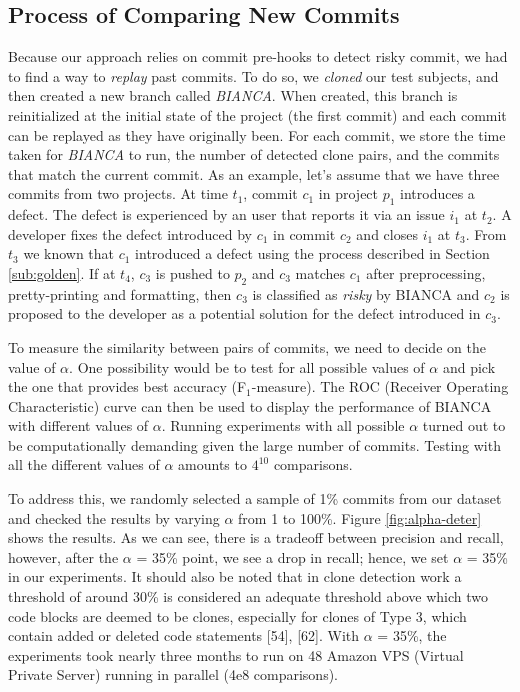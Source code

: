 \documentclass[conference]{IEEEtran}
\begin{document}
\subsection{Process of Comparing New Commits}\label{sec:newcommits}

Because our approach relies on commit pre-hooks to detect risky commit,
we had to find a way to \emph{replay} past commits. To do so, we
\emph{cloned} our test subjects, and then created a new branch called
\emph{BIANCA}. When created, this branch is reinitialized at the initial
state of the project (the first commit) and each commit can be replayed
as they have originally been. For each commit, we store the time taken
for \emph{BIANCA} to run, the number of detected clone pairs, and the
commits that match the current commit. As an example, let's assume that
we have three commits from two projects. At time $t_1$, commit $c_1$ in
project $p_1$ introduces a defect. The defect is experienced by an user
that reports it via an issue $i_1$ at $t_2$. A developer fixes the
defect introduced by $c_1$ in commit $c_2$ and closes $i_1$ at $t_3$.
From $t_3$ we known that $c_1$ introduced a defect using the process
described in Section \ref{sub:golden}. If at $t_4$, $c_3$ is pushed to
$p_2$ and $c_3$ matches $c_1$ after preprocessing, pretty-printing and
formatting, then $c_3$ is classified as \emph{risky} by BIANCA and $c_2$
is proposed to the developer as a potential solution for the defect
introduced in $c_3$.



To measure the similarity between pairs of commits, we need to decide on
the value of $\alpha$. One possibility would be to test for all possible
values of $\alpha$ and pick the one that provides best accuracy
(F$_1$-measure). The ROC (Receiver Operating Characteristic) curve can
then be used to display the performance of BIANCA with different values
of $\alpha$. Running experiments with all possible $\alpha$ turned out
to be computationally demanding given the large number of commits.
Testing with all the different values of $\alpha$ amounts to $4^{10}$
comparisons.

To address this, we randomly selected a sample of 1\% commits from our
dataset and checked the results by varying $\alpha$ from 1 to 100\%.
Figure \ref{fig:alpha-deter} shows the results. As we can see, there is
a tradeoff between precision and recall, however, after the $\alpha$ =
35\% point, we see a drop in recall; hence, we set $\alpha$ = 35\% in
our experiments. It should also be noted that in clone detection work a
threshold of around 30\% is considered an adequate threshold above which
two code blocks are deemed to be clones, especially for clones of Type
3, which contain added or deleted code statements {[}54{]}, {[}62{]}.
With $\alpha$ = 35\%, the experiments took nearly three months to run on
48 Amazon VPS (Virtual Private Server) running in parallel (4e8
comparisons).
\end{document}
